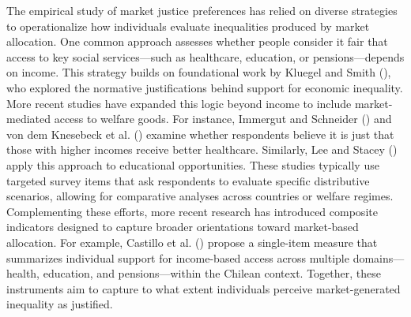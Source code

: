 \documentclass[
  12pt,
]{article}
\begin{document}
The empirical study of market justice preferences has relied on diverse
strategies to operationalize how individuals evaluate inequalities
produced by market allocation. One common approach assesses whether
people consider it fair that access to key social services---such as
healthcare, education, or pensions---depends on income. This strategy
builds on foundational work by Kluegel and Smith
(), who explored the normative
justifications behind support for economic inequality. More recent
studies have expanded this logic beyond income to include
market-mediated access to welfare goods. For instance, Immergut and
Schneider () and von dem Knesebeck
et al. () examine whether
respondents believe it is just that those with higher incomes receive
better healthcare. Similarly, Lee and Stacey
() apply this approach to
educational opportunities. These studies typically use targeted survey
items that ask respondents to evaluate specific distributive scenarios,
allowing for comparative analyses across countries or welfare regimes.
Complementing these efforts, more recent research has introduced
composite indicators designed to capture broader orientations toward
market-based allocation. For example, Castillo et al.
() propose a single-item
measure that summarizes individual support for income-based access
across multiple domains---health, education, and pensions---within the
Chilean context. Together, these instruments aim to capture to what
extent individuals perceive market-generated inequality as justified.
\end{document}
